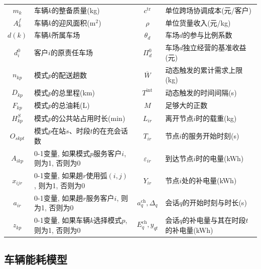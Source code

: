 \documentclass{setp-new}
\begin{document}
\begin{table}[H]
\begin{tabular*}{\linewidth}{@{\extracolsep{\fill}}cJcJ@{}}
$m_k$ & 车辆$k$的整备质量(kg) & $c^{\mathrm{tr}}$ & 单位跨场协调成本(元/客户)\\
$A_k^f$ & 车辆$k$的迎风面积(m$^2$) & $\rho$ & 单位货量收入(元/kg)\\
$d(k)$ & 车辆$k$所属车场 & $\theta_d$ & 车场$d$的参与比例系数\\
$d_i^0$ & 客户$i$的原责任车场 & $\Pi_d^0$ & 车场$d$独立经营的基准收益(元)\\
$n_{kp}$ & 模式$p$的配送趟数 & $\overline W$ & 动态触发的累计需求上限(kg)\\
$D_{kp}$ & 模式$p$的总里程(km) & $T^{\mathrm{int}}$ & 动态触发的时间间隔(s)\\
$F_{kp}$ & 模式$p$的总油耗(L) & $M$ & 足够大的正数\\
$H_{kp}^{S}$ & 模式$p$的公共站占用时长(min) & $L_{ir}$ & 离开节点$i$时的载重(kg)\\
$O_{skpt}$ & 模式$p$在站$s$、时段$t$的在充会话数 & $T_{ir}$ & 节点$i$的服务开始时刻(s)\\
$A_{ikp}$ & 0-1变量, 如果模式$p$服务客户$i$, 则为1, 否则为0 & $\varepsilon_{ir}$ & 到达节点$i$时的电量(kWh)\\
$x_{ijr}$ & 0-1变量, 如果趟$r$使用弧$(i,j)$, 则为1, 否则为0 & $Y_{ir}$ & 节点$i$处的补电量(kWh)\\
$a_{ir}$ & 0-1变量, 如果趟$r$服务客户$i$, 则为1, 否则为0 & $a_q^{\mathrm{ch}},\Delta_q$ & 会话$q$的开始时刻与时长(s)\\
$z_{kp}$ & 0-1变量, 如果车辆$k$选择模式$p$, 则为1, 否则为0 & $E_q^{\mathrm{ch}},y_{qt}$ & 会话$q$的补电量与其在时段$t$的补电量(kWh)\\
\bottomrule
\end{tabular*}
\end{table}

\subsection{车辆能耗模型}
\end{document}
